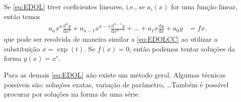 \documentclass[a4paper,12pt, leqno, answers]{exam}
\begin{document}
Se \eqref{eq:EDOL} tiver coeficientes lineares, i.e., se $a_i(x)$ for uma fun\c{c}\~{a}o linear, ent\~{a}o temos
\begin{align*}
    a_n x^n \frac{\mathrm{d}^ny}{\mathrm{d}x^n} + a_{n - 1} x^{n - 1} \frac{\mathrm{d}^{n - 1}y}{\mathrm{d}x^{n - 1}} + \ldots + a_1 x \frac{\mathrm{d}y}{\mathrm{d}x} + a_0 y &= f x. \tag{Euler} \label{eq:Euler}
\end{align*}
que pode ser resolvida de maneira similar a \eqref{eq:EDOLCC} ao utilizar a substitui\c{c}\~{a}o $x = \exp(t)$. Se $f(x) = 0$, ent\~{a}o podemos tentar solu\c{c}\~{o}es da forma $y(x) = x^r$.

Para as demais \eqref{eq:EDOL} n\~{a}o existe um m\'{e}todo geral. Algumas t\'{e}cnicas poss\'{i}veis s\~{a}o: solu\c{c}\~{o}es exatas, varia\c{c}\~{a}o de par\^{a}metro, \ldots Tamb\'{e}m \'{e} poss\'{i}vel procurar por solu\c{c}\~{o}es na forma de uma s\'{e}rie.
\end{document}
